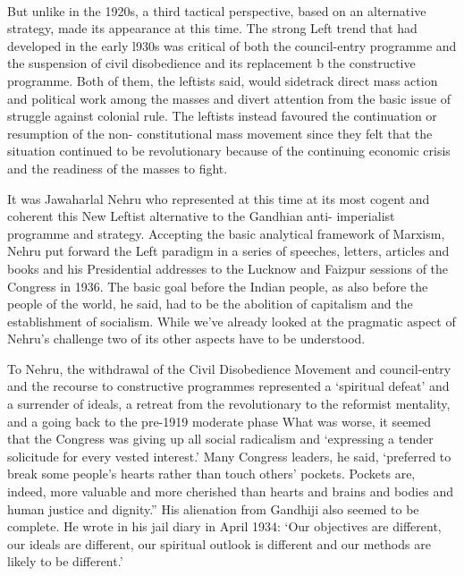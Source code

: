 \begin{multicols}{2}
\paragraph*{}

But unlike in the 1920s, a third tactical perspective, based on an alternative strategy, made its appearance at this time. The strong Left trend that had developed in the early l930s was critical of both the council-entry programme and the suspension of civil disobedience and its replacement b the constructive programme. Both of them, the leftists said, would sidetrack direct mass action and political work among the masses and divert attention from the basic issue of struggle against colonial rule. The leftists instead favoured the continuation or resumption of the non- constitutional mass movement since they felt that the situation continued to be revolutionary because of the continuing economic crisis and the readiness of the masses to fight. 

It was Jawaharlal Nehru who represented at this time at its most cogent and coherent this New Leftist alternative to the Gandhian anti- imperialist programme and strategy. Accepting the basic analytical framework of Marxism, Nehru put forward the Left paradigm in a series of speeches, letters, articles and books and his Presidential addresses to the Lucknow and Faizpur sessions of the Congress in 1936. The basic goal before the Indian people, as also before the people of the world, he said, had to be the abolition of capitalism and the establishment of socialism. While we've already looked at the pragmatic aspect of Nehru's challenge two of its other aspects have to be understood. 

To Nehru, the withdrawal of the Civil Disobedience Movement and council-entry and the recourse to constructive programmes represented a `spiritual defeat' and a surrender of ideals, a retreat from the revolutionary to the reformist mentality, and a going back to the pre-1919 moderate phase What was worse, it seemed that the Congress was giving up all social radicalism and `expressing a tender solicitude for every vested interest.' Many Congress leaders, he said, `preferred to break some people's hearts rather than touch others' pockets. Pockets are, indeed, more valuable and more cherished than hearts and brains and bodies and human justice and dignity.'' His alienation from Gandhiji also seemed to be complete. He wrote in his jail diary in April 1934: `Our objectives are different, our ideals are different, our spiritual outlook is different and our methods are likely to be different.' 


\end{multicols}
